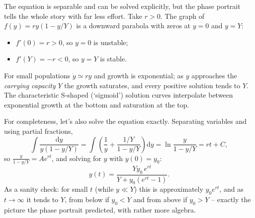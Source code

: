 \documentclass[a4paper]{scrartcl}
\begin{document}
The equation is separable and can be solved explicitly, but the phase portrait tells the whole story with far less effort. Take $r > 0$. The graph of $f(y) = ry(1 - y/Y)$ is a downward parabola with zeros at $y = 0$ and $y = Y$:
\begin{itemize}
	\item $f'(0) = r > 0$, so $y = 0$ is unstable;
	\item $f'(Y) = -r < 0$, so $y = Y$ is stable.
\end{itemize}

\begin{center}
\end{center}
For small populations $\dot y \simeq ry$ and growth is exponential; as $y$ approaches the \emph{carrying capacity} $Y$ the growth saturates, and every positive solution tends to $Y$. The characteristic S-shaped (`sigmoid') solution curves interpolate between exponential growth at the bottom and saturation at the top.

For completeness, let's also solve the equation exactly. Separating variables and using partial fractions,
$$
\int \frac{\mathrm{d}y}{y(1 - y/Y)} = \int \left(\frac 1y + \frac{1/Y}{1 - y/Y}\right)\mathrm{d}y = \ln \frac{y}{1 - y/Y} = rt + C,
$$
so $\frac{y}{1 - y/Y} = A e^{rt}$, and solving for $y$ with $y(0) = y_0$:
$$
y(t) = \frac{Y y_0 \, e^{rt}}{Y + y_0(e^{rt} - 1)}.
$$
As a sanity check: for small $t$ (while $y \ll Y$) this is approximately $y_0 e^{rt}$, and as $t \to \infty$ it tends to $Y$, from below if $y_0 < Y$ and from above if $y_0 > Y$ -- exactly the picture the phase portrait predicted, with rather more algebra.

\begin{center}
\end{center}
\end{document}
